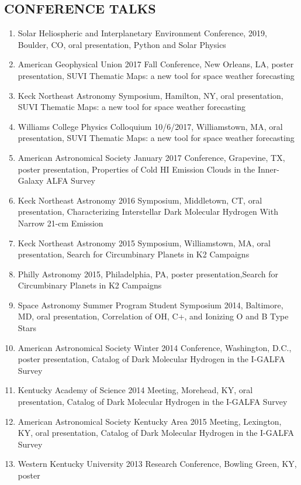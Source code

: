 \documentclass[line,margin]{res}
\begin{document}
\begin{resume}
  \section{CONFERENCE TALKS	}
  \begin{enumerate}[leftmargin=*]
    \item Solar Heliospheric and Interplanetary Environment Conference, 2019, Boulder, CO, oral presentation, Python and Solar Physics
    \item American Geophysical Union 2017 Fall Conference, New Orleans, LA, poster presentation, SUVI
    Thematic Maps: a new tool for space weather forecasting
    \item Keck Northeast Astronomy Symposium, Hamilton, NY, oral presentation, SUVI Thematic
    Maps: a new tool for space weather forecasting
    \item Williams College Physics Colloquium 10/6/2017, Williamstown, MA, oral presentation,
    SUVI Thematic Maps: a new tool for space weather forecasting
    \item American Astronomical Society January 2017 Conference, Grapevine, TX, poster
    presentation, Properties of Cold HI Emission Clouds in the Inner-Galaxy ALFA Survey
    \item Keck Northeast Astronomy 2016 Symposium, Middletown, CT, oral presentation,
    Characterizing Interstellar Dark Molecular Hydrogen With Narrow 21-cm Emission
    \item Keck Northeast Astronomy 2015 Symposium, Williamstown, MA, oral presentation,
    Search for Circumbinary Planets in K2 Campaigns
    \item Philly Astronomy 2015, Philadelphia, PA, poster presentation,Search for Circumbinary
    Planets in K2 Campaigns
    \item Space Astronomy Summer Program Student Symposium 2014, Baltimore, MD, oral
    presentation, Correlation of OH, C+, and Ionizing O and B Type Stars
    \item American Astronomical Society Winter 2014 Conference, Washington, D.C., poster
    presentation, Catalog of Dark Molecular Hydrogen in the I-GALFA Survey
    \item Kentucky Academy of Science 2014 Meeting, Morehead, KY, oral presentation, Catalog
    of Dark Molecular Hydrogen in the I-GALFA Survey
    \item American Astronomical Society Kentucky Area 2015 Meeting, Lexington, KY, oral
    presentation, Catalog of Dark Molecular Hydrogen in the I-GALFA Survey
    \item Western Kentucky University 2013 Research Conference, Bowling Green, KY, poster

\end{enumerate}
\end{resume}
\end{document}
